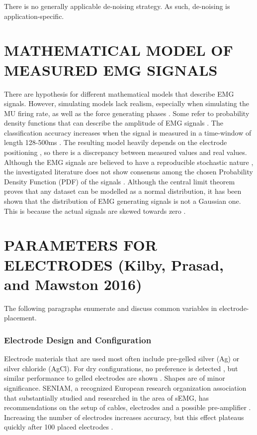 \documentclass{article}
\begin{document}
There is no generally applicable de-noising strategy. As such, de-noising is application-specific.

\section{MATHEMATICAL MODEL OF MEASURED EMG SIGNALS}
There are hypothesis for different mathematical models that describe EMG signals. However, simulating models lack realism, especially when simulating the MU firing rate, as well as the force generating phases \cite{AlHarrach2017}. Some refer to probability density functions that can describe the amplitude of EMG signals \cite{Thongpanja2015} \cite{Nazarpour2013}. The classification accuracy increases when the signal is measured in a time-window of length 128-500ms \cite{Farina2000}\cite{Thongpanja2015} \cite{Matsubara2013}. The resulting model heavily depends on the electrode positioning \cite{Nazmi2016}, so there is a discrepancy between measured values and real values. Although the EMG signals are believed to have a reproducible \cite{Du2017} stochastic nature \cite{Rogers2013} \cite{Thongpanja2013} \cite{Clancy1999}, the investigated literature does not show consensus among the chosen Probability Density Function (PDF) of the signals \cite{Nazmi2016}. Although the central limit theorem proves that any dataset can be modelled as a normal distribution, it has been shown that the distribution of EMG generating signals is not a Gaussian one. This is because the actual signals are skewed towards zero \cite{Hunter1987} \cite{Bilodeau1997}.

\section{PARAMETERS FOR ELECTRODES (Kilby, Prasad, and Mawston 2016)}
The following paragraphs enumerate and discuss common variables in electrode-placement.

\subsubsection{Electrode Design and Configuration} Electrode materials that are used most often include pre-gelled silver (Ag) or silver chloride (AgCl). For dry configurations, no preference is detected \cite{Kilby2016}, but similar performance to gelled electrodes are shown \cite{McIntosh2016}. Shapes are of minor significance. SENIAM, a recognized European research organization association that substantially studied and researched in the area of sEMG, has recommendations on the setup of cables, electrodes and a possible pre-amplifier \cite{Kilby2016}. Increasing the number of electrodes increases accuracy, but this effect plateaus quickly after 100 placed electrodes \cite{Amma2015}.
\end{document}

